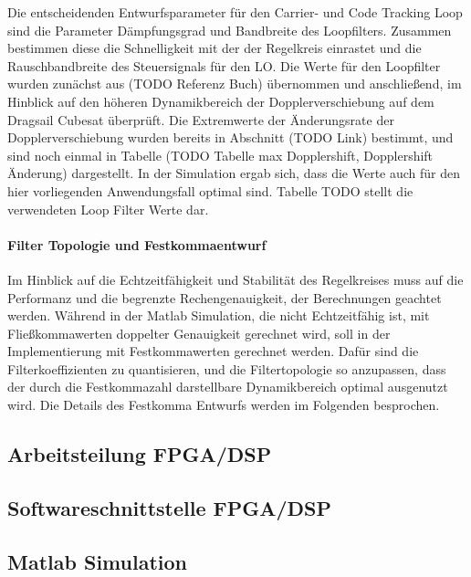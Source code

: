 Die entscheidenden Entwurfsparameter für den Carrier- und Code Tracking Loop sind die Parameter Dämpfungsgrad und Bandbreite des Loopfilters. Zusammen bestimmen diese die Schnelligkeit mit der der Regelkreis einrastet und die Rauschbandbreite des Steuersignals für den LO.
Die Werte für den Loopfilter wurden zunächst aus (TODO Referenz Buch) übernommen und anschließend, im Hinblick auf den höheren Dynamikbereich der Dopplerverschiebung auf dem Dragsail Cubesat überprüft. Die Extremwerte der Änderungsrate der Dopplerverschiebung wurden bereits in Abschnitt (TODO Link) bestimmt, und sind noch einmal in Tabelle (TODO Tabelle max Dopplershift, Dopplershift Änderung) dargestellt.
In der Simulation ergab sich, dass die Werte auch für den hier vorliegenden Anwendungsfall optimal sind. Tabelle TODO stellt die verwendeten Loop Filter Werte dar.

\paragraph{Filter Topologie und Festkommaentwurf}
Im Hinblick auf die Echtzeitfähigkeit und Stabilität des Regelkreises muss auf die Performanz und die begrenzte Rechengenauigkeit, der Berechnungen geachtet werden. Während in der Matlab Simulation, die nicht Echtzeitfähig ist, mit Fließkommawerten doppelter Genauigkeit gerechnet wird, soll in der Implementierung mit Festkommawerten gerechnet werden.
Dafür sind die Filterkoeffizienten zu quantisieren, und die Filtertopologie so anzupassen, dass der durch die Festkommazahl darstellbare Dynamikbereich optimal ausgenutzt wird. Die Details des Festkomma Entwurfs werden im Folgenden besprochen.


\subsection{Arbeitsteilung FPGA/DSP}

\subsection{Softwareschnittstelle FPGA/DSP}

\subsection{Matlab Simulation}

